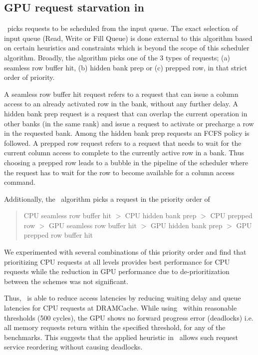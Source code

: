 \subsection{GPU request starvation in \prioname}
\prioname\ picks requests to be scheduled from the input queue. The exact selection of input queue (Read, Write or Fill Queue) is done external to this algorithm based on certain heuristics and constraints which is beyond the scope of this scheduler algorithm. Broadly, the algorithm picks one of the 3 types of requests; (a) seamless row buffer hit, (b) hidden bank prep or (c) prepped row, in that strict order of priority. 
\par A seamless row buffer hit request refers to a request that can issue a column access to an already activated row in the bank, without any further delay. A hidden bank prep request is a request that can overlap the current operation in other banks (in the same rank) and issue a request to activate or precharge a row in the requested bank. Among the hidden bank prep requests an FCFS policy is followed. A prepped row request refers to a request that needs to wait for the current column access to complete to the currently active row in a bank. Thus choosing a prepped row leads to a bubble in the pipeline of the scheduler where the request has to wait for the row to become available for a column access command.

\par Additionally, the \prioname\ algorithm picks a request in the priority order of
\begin{quote}
	CPU seamless row buffer hit $>$ CPU hidden bank prep $>$ CPU prepped row $>$ GPU seamless row buffer hit $>$ GPU hidden bank prep $>$ GPU prepped row buffer hit
\end{quote}
We experimented with several combinations of this priority order and find that prioritizing CPU requests at all levels provides best performance for CPU requests while the reduction in GPU performance due to de-prioritization between the schemes was not significant.
\par Thus, \prioname\ is able to reduce access latencies by reducing waiting delay and queue latencies for CPU requests at DRAMCache. While using \prioname\ within reasonable thresholds (500 cycles), the GPU shows no forward progress error (deadlocks)  i.e. all memory requests return within the specified threshold, for any of the benchmarks. This suggests that the applied heuristic in \prioname\ allows such request service reordering without causing deadlocks.

